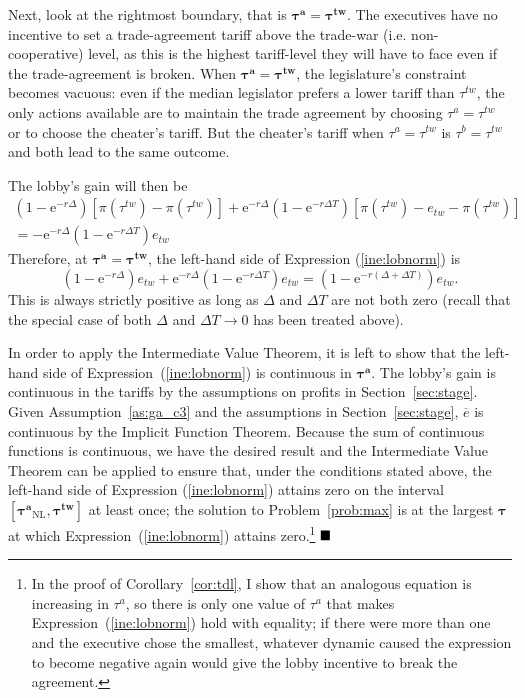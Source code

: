 \documentclass[authoryear, review]{elsarticle}
\newcommand{\ov}{\overline}
\newcommand{\bta}{\bm{\tau^a}}
\newcommand{\btw}{\bm{\tau^{tw}}}
\begin{document}
{Next, look at the rightmost boundary, that is $\bta=\btw$. The executives have no incentive to set a trade-agreement tariff above the trade-war (i.e. non-cooperative) level, as this is the highest tariff-level they will have to face even if the trade-agreement is broken. When $\bta=\btw$, the legislature's constraint becomes vacuous: even if the median legislator prefers a lower tariff than $\tau^{tw}$, the only actions available are to maintain the trade agreement by choosing $\tau^a=\tau^{tw}$ or to choose the cheater's tariff. But the cheater's tariff when $\tau^a=\tau^{tw}$ is $\tau^b=\tau^{tw}$ and both lead to the same outcome.

The lobby's gain will then be 
\begin{multline*}
  \left(1-\mathrm{e}^{-r\Delta}\right) \left[\pi(\tau^{tw}) - \pi(\tau^{tw}) \right] + \mathrm{e}^{-r\Delta}\left(1-\mathrm{e}^{-r\Delta T}\right) \left[\pi(\tau^{tw}) - e_{tw} - \pi(\tau^{tw}) \right] \\
	= - \mathrm{e}^{-r\Delta}\left(1-\mathrm{e}^{-r\Delta T}\right) e_{tw}
\end{multline*}
Therefore, at $\bta=\btw$, the left-hand side of Expression (\ref{ine:lobnorm}) is
\[
  \left(1-\mathrm{e}^{-r\Delta}\right) e_{tw} + \mathrm{e}^{-r\Delta}\left(1-\mathrm{e}^{-r\Delta T}\right) e_{tw} = \left(1 - \mathrm{e}^{-r\left(\Delta +\Delta T\right)} \right)e_{tw}.
\]
This is always strictly positive as long as $\Delta$ and $\Delta T$ are not both zero (recall that the special case of both $\Delta$ and $\Delta T \rightarrow 0$ has been treated above).

In order to apply the Intermediate Value Theorem, it is left to show that the left-hand side of Expression~(\ref{ine:lobnorm}) is continuous in $\bta$. The lobby's gain is continuous in the tariffs by the assumptions on profits in Section~\ref{sec:stage}. Given Assumption~\ref{as:ga_c3} and the assumptions in Section~\ref{sec:stage}, $\ov{e}$ is continuous by the Implicit Function Theorem. Because the sum of continuous functions is continuous, we have the desired result and the Intermediate Value Theorem can be applied to ensure that, under the conditions stated above, the left-hand side of Expression (\ref{ine:lobnorm}) attains zero on the interval $\left[\bta_\text{NL},\btw\right]$ at least once; the solution to Problem~\ref{prob:max} is at the largest $\bm{\tau}$ at which Expression~(\ref{ine:lobnorm}) attains zero.\footnote{In the proof of Corollary~\ref{cor:tdl}, I show that an analogous equation is increasing in $\tau^a$, so there is only one value of $\tau^a$ that makes Expression~(\ref{ine:lobnorm}) hold with equality; if there were more than one and the executive chose the smallest, whatever dynamic caused the expression to become negative again would give the lobby incentive to break the agreement.\label{fn:lem3}}  $\hfill\blacksquare$

}
\end{document}
